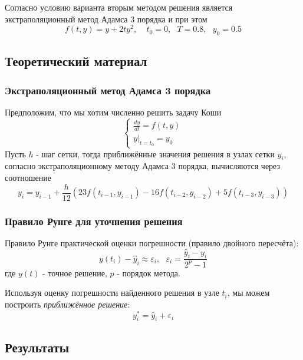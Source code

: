 \documentclass[12pt]{article}%
\begin{document}
Согласно условию варианта вторым методом решения является экстраполяционный метод Адамса 3 порядка и при этом
$$
f(t, y) = y + 2ty^2 ,\ \ \ \ \ t_0 = 0,\ \ \ T = 0.8,\ \ \ y_0 = 0.5
$$

\subsection{Теоретический материал}
\subsubsection{Экстраполяционный метод Адамса 3 порядка}
Предположим, что мы хотим численно решить задачу Коши
$$
\begin{cases}
    \frac{dy}{dt} = f(t, y) \\
    y |_{t = t_0} = y_0
\end{cases}
$$
Пусть $h$ - шаг сетки, тогда приближённые значения решения в узлах сетки $y_i$, согласно экстраполяционному методу Адамса 3 порядка, вычисляются через соотношение
\begin{equation}
    y_i = y_{i-1} + \frac{h}{12}
    \left(
    23 f(t_{i-1}, y_{i-1}) - 16 f(t_{i-2}, y_{i-2}) + 5 f(t_{i-3}, y_{i-3})
    \right)
\end{equation}

\subsubsection{Правило Рунге для уточнения решения}
Правило Рунге практической оценки погрешности (правило двойного пересчёта):
$$
y(t_i) - \hat{y}_i \approx \varepsilon_{i}, \ \ \ \varepsilon_i = \frac{\hat{y}_{i} - y_i}{2^p - 1}
$$
где $y(t)$ - точное решение, $p$ - порядок метода.

Используя оценку погрешности найденного решения в узле $t_i$, мы можем построить \textit{приближённое решение}:
\begin{equation}
    y^*_i = \hat{y}_i + \varepsilon_i
\end{equation}

\subsection{Результаты}
\end{document}
